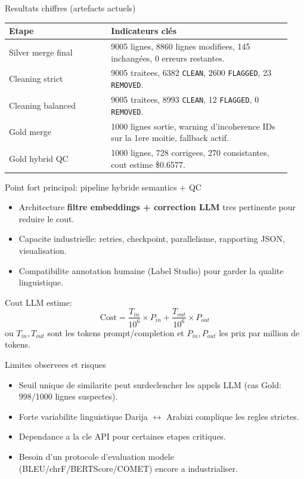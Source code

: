 \documentclass[10pt,aspectratio=169]{beamer}
\begin{document}
\begin{frame}{Resultats chiffres (artefacts actuels)}
  \small
  \begin{tabular}{p{0.34\linewidth} p{0.60\linewidth}}
    \toprule
    \textbf{Etape} & \textbf{Indicateurs clés} \\
    \midrule
    Silver merge final & 9005 lignes, 8860 lignes modifiees, 145 inchang\'ees, 0 erreurs restantes. \\
    \addlinespace
    Cleaning strict & 9005 traitees, 6382 \texttt{CLEAN}, 2600 \texttt{FLAGGED}, 23 \texttt{REMOVED}. \\
    \addlinespace
    Cleaning balanced & 9005 traitees, 8993 \texttt{CLEAN}, 12 \texttt{FLAGGED}, 0 \texttt{REMOVED}. \\
    \addlinespace
    Gold merge & 1000 lignes sortie, warning d'incoherence IDs sur la 1ere moitie, fallback actif. \\
    \addlinespace
    Gold hybrid QC & 1000 lignes, 728 corrigees, 270 consistantes, cout estime \$0.6577. \\
    \bottomrule
  \end{tabular}
\end{frame}

\begin{frame}{Point fort principal: pipeline hybride semantics + QC}
  \begin{itemize}
    \item Architecture \textbf{filtre embeddings + correction LLM} tres pertinente pour reduire le cout.
    \item Capacite industrielle: retries, checkpoint, parallelisme, rapporting JSON, visualisation.
    \item Compatibilite annotation humaine (Label Studio) pour garder la qualite linguistique.
  \end{itemize}

  \vspace{0.2cm}
  Cout LLM estime:
  \[
    \text{Cost} = \frac{T_{in}}{10^6} \times P_{in} + \frac{T_{out}}{10^6} \times P_{out}
  \]
  \small
  ou $T_{in}, T_{out}$ sont les tokens prompt/completion et $P_{in}, P_{out}$ les prix par million de tokens.
\end{frame}

\begin{frame}{Limites observees et risques}
  \begin{itemize}
    \item Seuil unique de similarite peut surdeclencher les appels LLM (cas Gold: 998/1000 lignes suspectes).
    \item Forte variabilite linguistique Darija $\leftrightarrow$ Arabizi complique les regles strictes.
    \item Dependance a la cle API pour certaines etapes critiques.
    \item Besoin d'un protocole d'evaluation modele (BLEU/chrF/BERTScore/COMET) encore a industrialiser.
  \end{itemize}
\end{frame}
\end{document}
